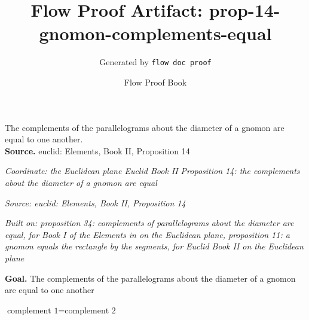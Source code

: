\documentclass[11pt]{article}
\title{Flow Proof Artifact: prop-14-gnomon-complements-equal}
\author{Generated by \texttt{flow doc proof}}
\date{Flow Proof Book}
\theoremstyle{definition}
\begin{document}
\maketitle
The complements of the parallelograms about the diameter of a gnomon are equal to one another.\\[0.5em]
\textbf{Source.} euclid: Elements, Book II, Proposition 14\\[0.5em]
\bigskip
{}\par
\smallskip\noindent\textit{Coordinate: the Euclidean plane \cdot Euclid Book II \cdot Proposition 14: the complements about the diameter of a gnomon are equal}\par
\smallskip\noindent\textit{Source: euclid: Elements, Book II, Proposition 14}\par
\smallskip\noindent\textit{Built on: proposition 34: complements of parallelograms about the diameter are equal, for Book I of the Elements in on the Euclidean plane, proposition 11: a gnomon equals the rectangle by the segments, for Euclid Book II on the Euclidean plane}\par
\medskip
\noindent\textbf{Goal.} The complements of the parallelograms about the diameter of a gnomon are equal to one another\par
\noindent$\displaystyle \text{complement 1} = \text{complement 2}$\par
\medskip
\noindent
\end{document}
